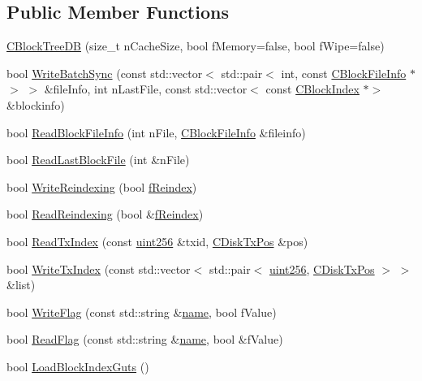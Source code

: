 \subsection*{Public Member Functions}
\begin{DoxyCompactItemize}
\item 
\mbox{\hyperlink{class_c_block_tree_d_b_a52fd1b1dc02c2a4e977099e2c2c50424}{C\+Block\+Tree\+DB}} (size\+\_\+t n\+Cache\+Size, bool f\+Memory=false, bool f\+Wipe=false)
\item 
bool \mbox{\hyperlink{class_c_block_tree_d_b_af5509ed62ce84023882fe243e4cd21ba}{Write\+Batch\+Sync}} (const std\+::vector$<$ std\+::pair$<$ int, const \mbox{\hyperlink{class_c_block_file_info}{C\+Block\+File\+Info}} $\ast$$>$ $>$ \&file\+Info, int n\+Last\+File, const std\+::vector$<$ const \mbox{\hyperlink{class_c_block_index}{C\+Block\+Index}} $\ast$$>$ \&blockinfo)
\item 
bool \mbox{\hyperlink{class_c_block_tree_d_b_a6f951198dc53fbe9194626ff82638656}{Read\+Block\+File\+Info}} (int n\+File, \mbox{\hyperlink{class_c_block_file_info}{C\+Block\+File\+Info}} \&fileinfo)
\item 
bool \mbox{\hyperlink{class_c_block_tree_d_b_adb1276fe2f0e0c4c106660948c581711}{Read\+Last\+Block\+File}} (int \&n\+File)
\item 
bool \mbox{\hyperlink{class_c_block_tree_d_b_a8fa5d150b98f4fd1aa8cf503eddfccef}{Write\+Reindexing}} (bool \mbox{\hyperlink{main_8h_a8e0eca589b2d4254a65f04c5d91888b2}{f\+Reindex}})
\item 
bool \mbox{\hyperlink{class_c_block_tree_d_b_a1abf6fc392048428aa24a12b7942824b}{Read\+Reindexing}} (bool \&\mbox{\hyperlink{main_8h_a8e0eca589b2d4254a65f04c5d91888b2}{f\+Reindex}})
\item 
bool \mbox{\hyperlink{class_c_block_tree_d_b_a74383427266d627e84c2d0c8e21e03c7}{Read\+Tx\+Index}} (const \mbox{\hyperlink{classuint256}{uint256}} \&txid, \mbox{\hyperlink{struct_c_disk_tx_pos}{C\+Disk\+Tx\+Pos}} \&pos)
\item 
bool \mbox{\hyperlink{class_c_block_tree_d_b_a1e03745f9675ad352a1483a0aa7ef308}{Write\+Tx\+Index}} (const std\+::vector$<$ std\+::pair$<$ \mbox{\hyperlink{classuint256}{uint256}}, \mbox{\hyperlink{struct_c_disk_tx_pos}{C\+Disk\+Tx\+Pos}} $>$ $>$ \&list)
\item 
bool \mbox{\hyperlink{class_c_block_tree_d_b_af2f65b70ac5d8a198d4f29a7e909c08a}{Write\+Flag}} (const std\+::string \&\mbox{\hyperlink{rest_8cpp_a8f8f80d37794cde9472343e4487ba3eb}{name}}, bool f\+Value)
\item 
bool \mbox{\hyperlink{class_c_block_tree_d_b_acd779c4653fd9a87fffe95d53ce7c6d3}{Read\+Flag}} (const std\+::string \&\mbox{\hyperlink{rest_8cpp_a8f8f80d37794cde9472343e4487ba3eb}{name}}, bool \&f\+Value)
\item 
bool \mbox{\hyperlink{class_c_block_tree_d_b_a12be19bb1d7253eeb40e1aa88b032346}{Load\+Block\+Index\+Guts}} ()
\end{DoxyCompactItemize}
